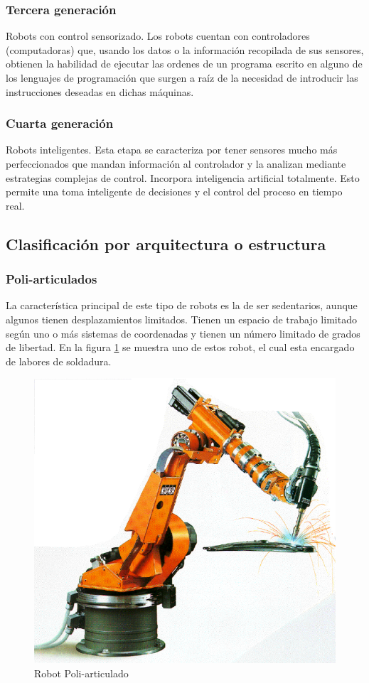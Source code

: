         \subsubsection{Tercera generación}
            Robots con control sensorizado. Los robots cuentan con controladores (computadoras) que, usando los datos o la información recopilada de sus sensores, obtienen la habilidad de ejecutar las ordenes de un programa escrito en alguno de los lenguajes de programación que surgen a raíz de la necesidad de introducir las instrucciones deseadas en dichas máquinas. 
        \subsubsection{Cuarta generación}
            Robots inteligentes. Esta etapa se caracteriza por tener sensores mucho más perfeccionados que mandan información al controlador y la analizan mediante estrategias complejas de control. Incorpora inteligencia artificial totalmente. Esto permite una toma inteligente de decisiones y el control del proceso en tiempo real.

        \newpage
        
    \subsection{Clasificación por arquitectura o estructura}
        
        \subsubsection{Poli-articulados}
        La característica principal de este tipo de robots es la de ser sedentarios, aunque algunos tienen desplazamientos limitados. Tienen un espacio de trabajo limitado según uno o más sistemas de coordenadas y tienen un número limitado de grados de libertad. En la figura \ref{f:Cap2_general_6} se muestra uno de estos robot, el cual esta encargado de labores de soldadura.
        
        \begin{figure}[htb]
            \centering
            \includegraphics[width=0.35\linewidth]{Main/Chapter2/Images2/Robot-poliarticulado.png}
            \caption{Robot Poli-articulado \cite{ER4pc}}
            \label{f:Cap2_general_6}
        \end{figure}
        
